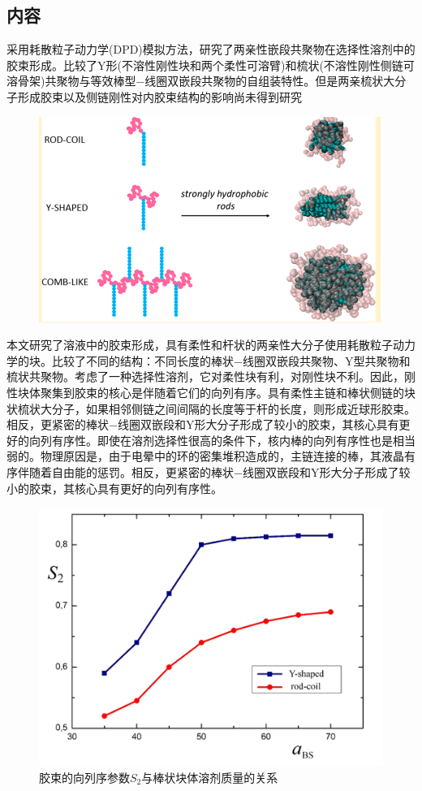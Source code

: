 \documentclass[12pt,a4paper]{article}
\numberwithin{equation}{section}
\begin{document}
\subsection{内容}
采用耗散粒子动力学(DPD)模拟方法，研究了两亲性嵌段共聚物在选择性溶剂中的胶束形成。比较了Y形(不溶性刚性块和两个柔性可溶臂)和梳状(不溶性刚性侧链可溶骨架)共聚物与等效棒型−线圈双嵌段共聚物的自组装特性。但是两亲梳状大分子形成胶束以及侧链刚性对内胶束结构的影响尚未得到研究
\begin{figure}[H]
\centering
\includegraphics[scale=0.4]{./figures/15.png}
\caption{}
\end{figure}
本文研究了溶液中的胶束形成，具有柔性和杆状的两亲性大分子使用耗散粒子动力学的块。比较了不同的结构：不同长度的棒状−线圈双嵌段共聚物、Y型共聚物和梳状共聚物。考虑了一种选择性溶剂，它对柔性块有利，对刚性块不利。因此，刚性块体聚集到胶束的核心是伴随着它们的向列有序。具有柔性主链和棒状侧链的块状梳状大分子，如果相邻侧链之间间隔的长度等于杆的长度，则形成近球形胶束。相反，更紧密的棒状−线圈双嵌段和Y形大分子形成了较小的胶束，其核心具有更好的向列有序性。即使在溶剂选择性很高的条件下，核内棒的向列有序性也是相当弱的。物理原因是，由于电晕中的环的密集堆积造成的，主链连接的棒，其液晶有序伴随着自由能的惩罚。相反，更紧密的棒状−线圈双嵌段和Y形大分子形成了较小的胶束，其核心具有更好的向列有序性。
\begin{figure}[H]
\centering
\includegraphics[scale=0.4]{./figures/16.png}
\caption{胶束的向列序参数$S_2$与棒状块体溶剂质量的关系}
\end{figure}
\end{document}
